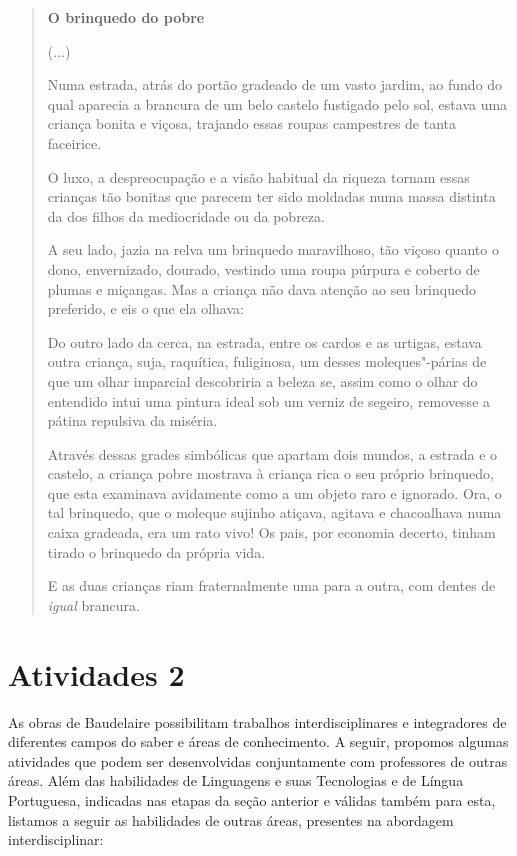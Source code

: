 \documentclass[12pt]{extarticle}
\begin{document}
\begin{quote}

\textbf{O brinquedo do pobre}\medskip

(...)

Numa estrada, atrás do portão gradeado de um vasto jardim, ao fundo do qual aparecia
a brancura de um belo castelo fustigado pelo sol, estava uma
criança bonita e viçosa, trajando essas roupas campestres de tanta
faceirice.

O luxo, a despreocupação e a visão habitual da riqueza tornam essas
crianças tão bonitas que parecem ter sido moldadas numa massa distinta da
dos filhos da mediocridade ou da pobreza.

A seu lado, jazia na relva um brinquedo maravilhoso, tão viçoso
quanto o dono, envernizado, dourado, vestindo uma roupa púrpura
e coberto de plumas e miçangas. Mas a criança não dava atenção ao seu
brinquedo preferido, e eis o que ela olhava:

Do outro lado da cerca, na estrada, entre os cardos e as urtigas, estava
outra criança, suja, raquítica, fuliginosa, um desses moleques"-párias
de que um olhar imparcial descobriria a beleza se, assim como o olhar do
entendido intui uma pintura ideal sob um verniz de segeiro,
removesse a pátina repulsiva da miséria.

Através dessas grades simbólicas que apartam dois mundos, a estrada e o
castelo, a criança pobre mostrava à criança rica o seu próprio
brinquedo, que esta examinava avidamente como a um objeto raro e
ignorado. Ora, o tal brinquedo, que o moleque sujinho atiçava,
agitava e chacoalhava numa caixa gradeada, era um rato vivo! Os pais,
por economia decerto, tinham tirado o brinquedo da própria vida.

E as duas crianças riam fraternalmente uma para a outra, com dentes de
\textit{igual} brancura.

\end{quote}



\section{Atividades 2}

\bnccreferenciasgerais


As obras de Baudelaire possibilitam trabalhos interdisciplinares e
integradores de diferentes campos do saber e áreas de conhecimento. A
seguir, propomos algumas atividades que podem ser desenvolvidas
conjuntamente com professores de outras áreas. Além das habilidades de
Linguagens e suas Tecnologias e de Língua Portuguesa, indicadas nas
etapas da seção anterior e válidas também para esta, listamos a seguir
as habilidades de outras áreas, presentes na abordagem interdisciplinar:
\end{document}
